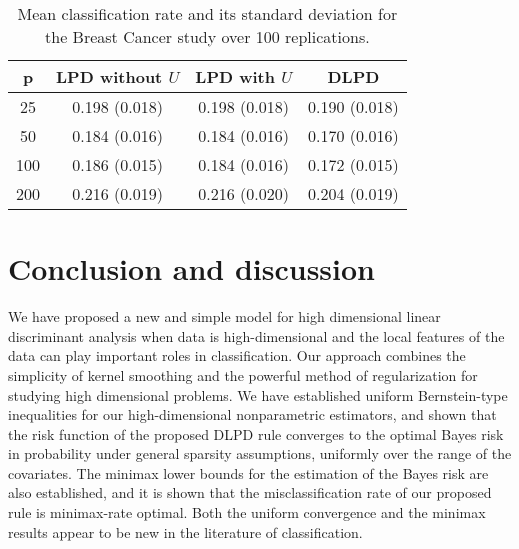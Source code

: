 \documentclass[11pt]{article}
\theoremstyle{definition}
\begin{document}
 
 \begin{table}
 	\centering
 	\begin{tabular}{|cccc|}
 		\hline
 		p	                 &     	LPD without $U$   &  LPD with $U$ & DLPD     \\
 		\hline
 		25                        & 0.198 (0.018)  & 0.198 (0.018)   & 0.190 (0.018)  \\
 		50                       & 0.184 (0.016)  & 0.184 (0.016)  & 0.170 (0.016)  \\
 		100                       & 0.186 (0.015)  & 0.184 (0.016)   & 0.172 (0.015)   \\
 		200                       & 0.216 (0.019)  & 0.216 (0.020)   & 0.204 (0.019)   \\
 		\hline
 	\end{tabular}
 	\caption[]{ Mean classification rate and its standard deviation for the Breast Cancer study over 100 replications. }\label{bc}
 \end{table}
 
 
 \section{Conclusion and discussion}
 We have proposed a new and simple model for high dimensional linear discriminant analysis when data is high-dimensional and the local features of the data can play important roles in classification.
 Our approach combines the simplicity of kernel smoothing and the powerful method of regularization for studying high dimensional problems. We have established uniform Bernstein-type inequalities for our high-dimensional nonparametric estimators, and shown that the risk function of the proposed DLPD rule converges to the optimal Bayes risk in probability under general sparsity assumptions, uniformly over the range of the covariates. The minimax lower bounds for the estimation of the Bayes risk are also established, and it is shown that the misclassification rate of our proposed rule is minimax-rate optimal. Both the uniform convergence  and the minimax results appear to be new in the literature of classification.
 
\end{document}
